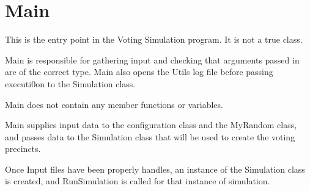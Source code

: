 %

\chapter{Main}
This is the entry point in the Voting Simulation program. It is not a true class.

Main is responsible for gathering input and checking that arguments passed in are of the correct type.  Main also opens the Utils log file before passing executi0on to the Simulation class.

Main does not contain any member functions or variables.

Main supplies input data to the configuration class and the MyRandom class, and passes data to the Simulation class that will be used to create the voting precincts.

Once Input files have been properly handles, an instance of the Simulation class is created, and RunSimulation is called for that instance of simulation.



